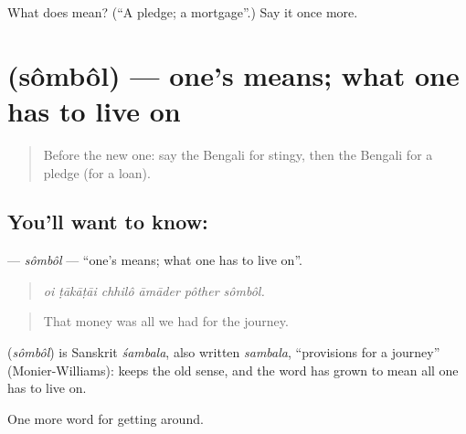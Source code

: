 \begin{tcolorbox}[breakable,colback=teal!4,colframe=teal!35!black,title={Before you move on}]
What does  mean? (\textquotedblleft{}A pledge; a mortgage\textquotedblright{}.) Say it once more.
\end{tcolorbox}
\section[\texorpdfstring{\bn{সম্বল} (sômbôl)}{সম্বল (sômbôl)}]{ (sômbôl) — one's means; what one has to live on}

\label{lesson:BN-C419-sombol}



\begin{quote}
Before the new one: say the Bengali for stingy, then the Bengali for a pledge (for a loan).
\end{quote}

\subsection*{You'll want to know: }
\textbf{} — \emph{sômbôl} — \textquotedblleft{}one's means; what one has to live on\textquotedblright{}.

\begin{quote}
     
\end{quote}

\begin{quote}
\emph{oi ṭākāṭāi chhilô āmāder pôther sômbôl.}
\end{quote}

\begin{quote}
That money was all we had for the journey.
\end{quote}

\begin{cousinweb}
\textbf{} (\emph{sômbôl}) is Sanskrit \emph{śambala}, also written \emph{sambala}, \textquotedblleft{}provisions for a journey\textquotedblright{} (Monier-Williams):   keeps the old sense, and the word has grown to mean all one has to live on.
\end{cousinweb}

\begin{grammarlens}[title={What you've built}]
One more word for getting around.
\end{grammarlens}

